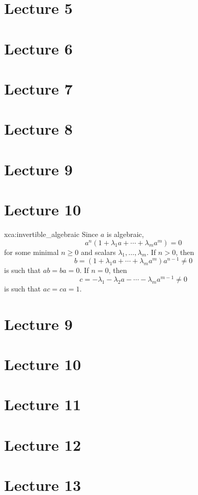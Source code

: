 \section*{Lecture 5}
\section*{Lecture 6}
\section*{Lecture 7}
\section*{Lecture 8}
\section*{Lecture 9}
\section*{Lecture 10}

\begin{sol}{xca:invertible_algebraic}
	Since $a$ is algebraic, 
	\[
		a^n(1+\lambda_1a+\cdots+\lambda_ma^m)=0
	\]
	for some minimal $n\geq0$ and scalars $\lambda_1,\dots,\lambda_m$. If  
	$n>0$, then 
	\[
	b=(1+\lambda_1a+\cdots+\lambda_ma^m)a^{n-1}\ne 0
	\]
	is such that $ab=ba=0$. If $n=0$, then  
	\[
		c=-\lambda_1-\lambda_2a-\cdots-\lambda_ma^{m-1}\ne 0
	\]
	is such that $ac=ca=1$. 
\end{sol}

\section*{Lecture 9}
\section*{Lecture 10}
\section*{Lecture 11}
\section*{Lecture 12}
\section*{Lecture 13}
